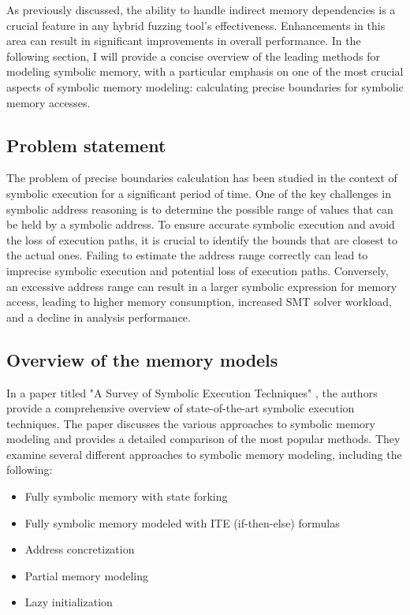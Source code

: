 \documentclass[conference]{IEEEtran}
\begin{document}
As previously discussed, the ability to handle indirect memory dependencies is a crucial feature in any hybrid fuzzing tool's effectiveness. Enhancements in this area can result in significant improvements in overall performance. In the following section, I will provide a concise overview of the leading methods for modeling symbolic memory, with a particular emphasis on one of the most crucial aspects of symbolic memory modeling: calculating precise boundaries for symbolic memory accesses.

\subsection{Problem statement}

The problem of precise boundaries calculation has been studied in the context of symbolic execution for a significant period of time. One of the key challenges in symbolic address reasoning is to determine the possible range of values that can be held by a symbolic address. To ensure accurate symbolic execution and avoid the loss of execution paths, it is crucial to identify the bounds that are closest to the actual ones. Failing to estimate the address range correctly can lead to imprecise symbolic execution and potential loss of execution paths. Conversely, an excessive address range can result in a larger symbolic expression for memory access, leading to higher memory consumption, increased SMT solver workload, and a decline in analysis performance.

\subsection{Overview of the memory models}

In a paper titled "A Survey of Symbolic Execution Techniques" \cite{a-survey-of-symbolic-execution-techniques}, the authors provide a comprehensive overview of state-of-the-art symbolic execution techniques. The paper discusses the various approaches to symbolic memory modeling and provides a detailed comparison of the most popular methods. They examine several different approaches to symbolic memory modeling, including the following:

\begin{itemize}
    \item Fully symbolic memory with state forking
    \item Fully symbolic memory modeled with ITE (if-then-else) formulas
    \item Address concretization
    \item Partial memory modeling
    \item Lazy initialization
\end{itemize}
\end{document}

